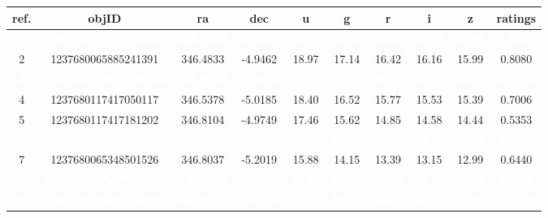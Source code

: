 \documentclass[referee]{aa}
\begin{document}
\begin{table}[!htb]
\centering
\begin{tabular}{cccccccccc}
\hline \hline
ref. & objID & ra & dec & u & g & r & i & z & ratings\\
\hline
\rowcolor[HTML]{D7261E}  \textcolor{white}{\textbf{1}} & \textcolor{white}{\textbf{1237680117417115692}} & \textcolor{white}{\textbf{346.7237}} & \textcolor{white}{\textbf{-5.0473}} & \textcolor{white}{\textbf{18.36}} & \textcolor{white}{\textbf{16.58}} & \textcolor{white}{\textbf{15.84}} & \textcolor{white}{\textbf{15.57}} & \textcolor{white}{\textbf{15.46}} & \textcolor{white}{\textbf{0.7345}}\\
2 & 1237680065885241391 & 346.4833 & -4.9462 & 18.97 & 17.14 & 16.42 & 16.16 & 15.99 & 0.8080\\
\rowcolor[HTML]{D7261E}  \textcolor{white}{\textbf{3}} & \textcolor{white}{\textbf{1237680117417115683}} & \textcolor{white}{\textbf{346.7128}} & \textcolor{white}{\textbf{-5.0499}} & \textcolor{white}{\textbf{17.59}} & \textcolor{white}{\textbf{15.78}} & \textcolor{white}{\textbf{15.11}} & \textcolor{white}{\textbf{14.87}} & \textcolor{white}{\textbf{14.80}} & \textcolor{white}{\textbf{0.3610}}\\
4 & 1237680117417050117 & 346.5378 & -5.0185 & 18.40 & 16.52 & 15.77 & 15.53 & 15.39 & 0.7006\\
5 & 1237680117417181202 & 346.8104 & -4.9749 & 17.46 & 15.62 & 14.85 & 14.58 & 14.44 & 0.5353\\
\rowcolor[HTML]{D7261E}  \textcolor{white}{\textbf{6}} & \textcolor{white}{\textbf{1237680065348435996}} & \textcolor{white}{\textbf{346.7072}} & \textcolor{white}{\textbf{-5.1987}} & \textcolor{white}{\textbf{16.70}} & \textcolor{white}{\textbf{14.70}} & \textcolor{white}{\textbf{13.90}} & \textcolor{white}{\textbf{13.68}} & \textcolor{white}{\textbf{13.52}} & \textcolor{white}{\textbf{0.3220}}\\
7 & 1237680065348501526 & 346.8037 & -5.2019 & 15.88 & 14.15 & 13.39 & 13.15 & 12.99 & 0.6440\\
\rowcolor[HTML]{D7261E}  \textcolor{white}{\textbf{8}} & \textcolor{white}{\textbf{1237680117417050120}} & \textcolor{white}{\textbf{346.5626}} & \textcolor{white}{\textbf{-5.1530}} & \textcolor{white}{\textbf{18.46}} & \textcolor{white}{\textbf{16.50}} & \textcolor{white}{\textbf{15.77}} & \textcolor{white}{\textbf{15.53}} & \textcolor{white}{\textbf{15.40}} & \textcolor{white}{\textbf{0.8298}}\\
\rowcolor[HTML]{0D4A05}  \textcolor{white}{\textbf{10}} & \textcolor{white}{\textbf{1237680117417115655}} & \textcolor{white}{\textbf{346.6500}} & \textcolor{white}{\textbf{-5.0393}} & \textcolor{white}{\textbf{17.20}} & \textcolor{white}{\textbf{15.38}} & \textcolor{white}{\textbf{14.65}} & \textcolor{white}{\textbf{14.40}} & \textcolor{white}{\textbf{14.28}} & \textcolor{white}{\textbf{1.0000}}\\

\end{tabular}
\end{table}
\end{document}

